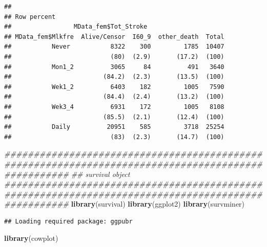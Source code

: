 \documentclass[
]{article}
\newenvironment{Shaded}{\begin{snugshade}}{\end{snugshade}}
\newcommand{\CommentTok}[1]{\textcolor[rgb]{0.56,0.35,0.01}{\textit{#1}}}
\newcommand{\DataTypeTok}[1]{\textcolor[rgb]{0.13,0.29,0.53}{#1}}
\newcommand{\KeywordTok}[1]{\textcolor[rgb]{0.13,0.29,0.53}{\textbf{#1}}}
\newcommand{\NormalTok}[1]{#1}
\newcommand{\OperatorTok}[1]{\textcolor[rgb]{0.81,0.36,0.00}{\textbf{#1}}}
\newcommand{\OtherTok}[1]{\textcolor[rgb]{0.56,0.35,0.01}{#1}}
\newcommand{\StringTok}[1]{\textcolor[rgb]{0.31,0.60,0.02}{#1}}
\begin{document}
\begin{Shaded}
\end{Shaded}

\begin{verbatim}
## 
## Row percent 
##                 MData_fem$Tot_Stroke
## MData_fem$Mlkfre  Alive/Censor  I60_9  other_death  Total
##           Never           8322    300         1785  10407
##                           (80)  (2.9)       (17.2)  (100)
##           Mon1_2          3065     84          491   3640
##                         (84.2)  (2.3)       (13.5)  (100)
##           Wek1_2          6403    182         1005   7590
##                         (84.4)  (2.4)       (13.2)  (100)
##           Wek3_4          6931    172         1005   8108
##                         (85.5)  (2.1)       (12.4)  (100)
##           Daily          20951    585         3718  25254
##                           (83)  (2.3)       (14.7)  (100)
\end{verbatim}

\begin{Shaded}
\begin{Highlighting}[]
\CommentTok{###################################################################################################}
\CommentTok{## survival object}
\CommentTok{###################################################################################################}
\KeywordTok{library}\NormalTok{(survival)}
\KeywordTok{library}\NormalTok{(ggplot2)}
\KeywordTok{library}\NormalTok{(survminer)}
\end{Highlighting}
\end{Shaded}

\begin{verbatim}
## Loading required package: ggpubr
\end{verbatim}

\begin{Shaded}
\begin{Highlighting}[]
\KeywordTok{library}\NormalTok{(cowplot)}
\end{Highlighting}
\end{Shaded}
\end{document}
